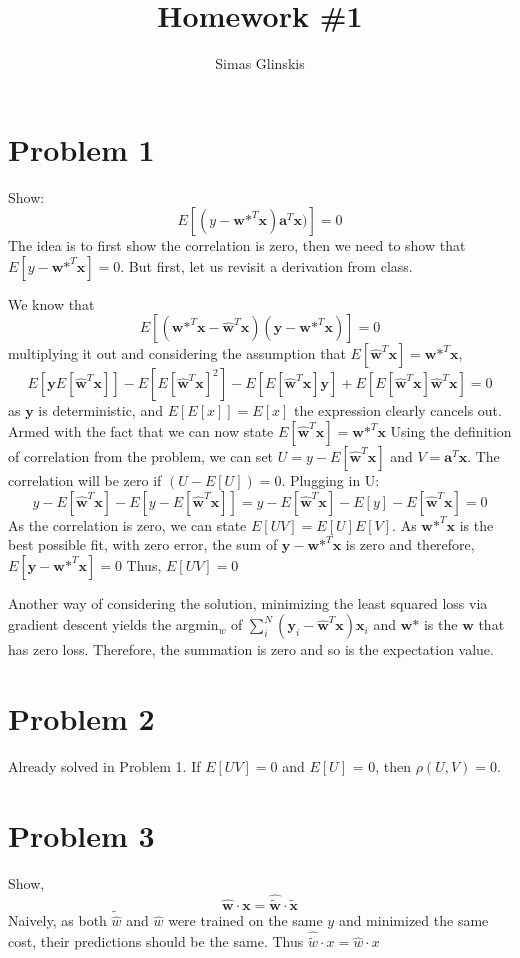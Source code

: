 \documentclass[]{article}
\title{Homework \#1}
\author{Simas Glinskis}
\begin{document}
\maketitle

\section*{Problem 1}
Show:
\[
E[(y-\textbf{w*}^T\textbf{x})\textbf{a}^T\textbf{x})] = 0
\]
The idea is to first show the correlation is zero, then we need to show that $E[y-\textbf{w*}^T\textbf{x}]=0$. But first, let us revisit a derivation from class.

We know that
\[
E[(\textbf{w*}^T\textbf{x}-\hat{\textbf{w}}^T\textbf{x})(\textbf{y}-\textbf{w*}^T\textbf{x})] = 0
\]
multiplying it out and considering the assumption that $E[\hat{\textbf{w}}^T\textbf{x}]=\textbf{w*}^T\textbf{x}$,
\[
E[\textbf{y}E[\hat{\textbf{w}}^T\textbf{x}]]-E[E[\hat{\textbf{w}}^T\textbf{x}]^2]-E[E[\hat{\textbf{w}}^T\textbf{x}]\textbf{y}] + E[E[\hat{\textbf{w}}^T\textbf{x}]\hat{\textbf{w}}^T\textbf{x}] = 0
\]
as $\textbf{y}$ is deterministic, and $E[E[x]]=E[x]$ the expression clearly cancels out.
Armed with the fact that we can now state $E[\hat{\textbf{w}}^T\textbf{x}]=\textbf{w*}^T\textbf{x}$
Using the definition of correlation from the problem, we can set $U=y-E[\hat{\textbf{w}}^T\textbf{x}]$ and $V=\textbf{a}^T\textbf{x}$. The correlation will be zero if $(U-E[U])=0$.
Plugging in U:
\[
y-E[\hat{\textbf{w}}^T\textbf{x}]-E[y-E[\hat{\textbf{w}}^T\textbf{x}]] = y-E[\hat{\textbf{w}}^T\textbf{x}]-E[y]-E[\hat{\textbf{w}}^T\textbf{x}] = 0
\]
As the correlation is zero, we can state $E[UV] = E[U]E[V]$. As $\textbf{w*}^T\textbf{x}$ is the best possible fit, with zero error, the sum of $\textbf{y}-\textbf{w*}^T\textbf{x}$ is zero and therefore, $E[\textbf{y}-\textbf{w*}^T\textbf{x}] = 0$
Thus, $E[UV] = 0$

Another way of considering the solution, minimizing the least squared loss via gradient descent yields the argmin$_w$ of $\sum_{i}^{N}(\textbf{y}_i-\hat{\textbf{w}}^T\textbf{x})\textbf{x}_i$ and $\textbf{w*}$ is the $\textbf{w}$ that has zero loss. Therefore, the summation is zero and so is the expectation value.
\section*{Problem 2}
Already solved in Problem 1. If $E[UV]=0$ and $E[U]$ = 0, then $\rho(U,V) = 0$.
\section*{Problem 3}
Show, \[
\hat{\textbf{w}}\cdot\textbf{x} = \hat{\tilde{\textbf{w}}}\cdot\tilde{\textbf{x}}
\]
Naively, as both $\tilde{\hat{w}}$ and $\hat{w}$ were trained on the same $y$ and minimized the same cost, their predictions should be the same. Thus $\hat{\tilde{w}}\cdot x = \hat{w}\cdot x$
\end{document}
